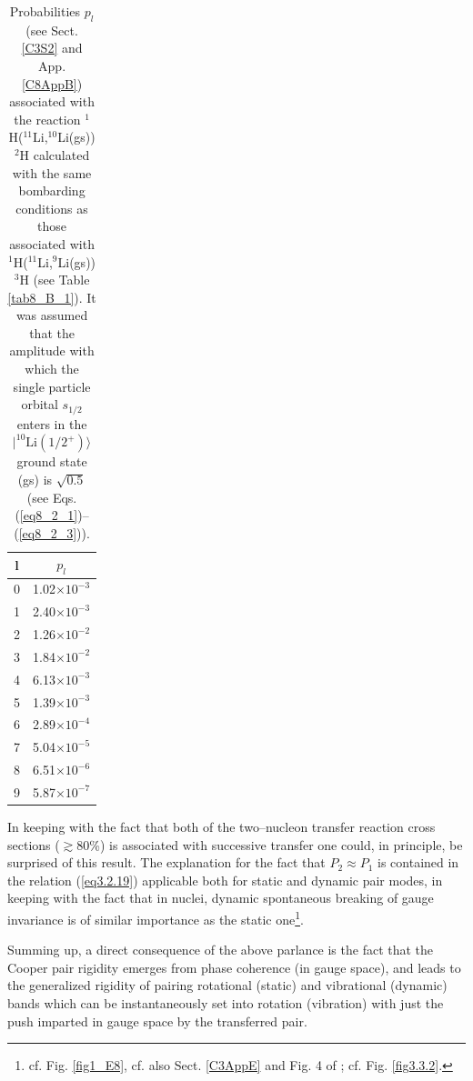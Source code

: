   \begin{table}
  \begin{tabular}{|c|c|}
  \hline  l & $p_l$ \\ 
\hline  0 & 1.02$\times 10^{-3}$ \\ 
\hline  1 & 2.40$\times 10^{-3}$ \\ 
\hline  2 &  1.26$\times 10^{-2}$ \\ 
\hline  3 &  1.84$\times 10^{-2}$ \\ 
\hline  4 &  6.13$\times 10^{-3}$\\ 
\hline  5 &  1.39$\times 10^{-3}$\\ 
\hline  6 &  2.89$\times 10^{-4}$\\ 
\hline  7 &  5.04$\times 10^{-5}$\\ 
\hline  8 &  6.51$\times 10^{-6}$\\ 
\hline  9 &  5.87$\times 10^{-7}$\\
\hline
  \end{tabular}\caption{Probabilities $p_l$ (see Sect. \ref{C3S2} and App. \ref{C8AppB}) associated with the reaction $^1$H($^{11}$Li,$^{10}$Li(gs))$^2$H calculated with the same bombarding conditions as those associated with $^1$H($^{11}$Li,$^{9}$Li(gs))$^3$H (see Table \ref{tab8_B_1}). It was assumed that the amplitude with which the single particle orbital $s_{1/2}$ enters in the $|^{10}\text{Li}(1/2^+)\rangle$ ground state (gs) is $\sqrt{0.5}$ (see Eqs. (\ref{eq8_2_1})--(\ref{eq8_2_3})).}\label{tab3.3.1}
  \end{table}

In keeping with the fact that both of the two--nucleon transfer reaction cross sections ($\gtrsim 80$\%) is associated with successive transfer one could, in principle, be surprised of this result. The explanation for the fact that $P_2\approx P_1$ is contained in the relation (\ref{eq3.2.19}) applicable both for static and dynamic pair modes, in keeping with the fact that in nuclei, dynamic spontaneous breaking of gauge invariance is of similar importance as the static one\footnote{cf. Fig. \ref{fig1_E8}, cf. also Sect. \ref{C3AppE} and Fig. 4 of \cite{Potel:13b}; cf. Fig. \ref{fig3.3.2}.}. 


Summing up, a direct consequence of the above parlance is the fact that the Cooper pair rigidity emerges from phase coherence (in gauge space), and leads to the generalized rigidity of pairing rotational (static) and vibrational (dynamic) bands which can be instantaneously set into rotation (vibration) with just the push imparted in gauge space by the transferred pair.






